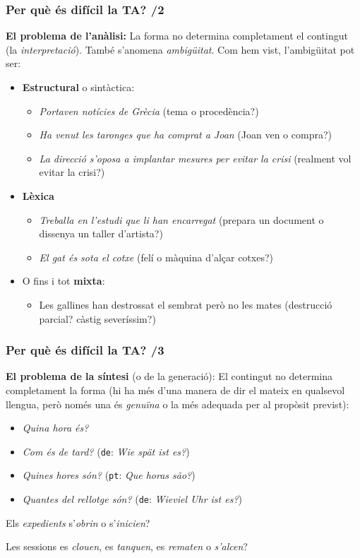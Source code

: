 \documentclass{beamer}
\newcommand{\empha}[1]{\emph{#1}\/}
\begin{document}
\begin{frame}
  \frametitle{ Per què és difícil la TA? /2} 
  
  \textbf{El problema de l'anàlisi:} La forma no determina completament el
  contingut (la \empha{interpretació}). També s'anomena \empha{ambigüitat}. 
  Com hem vist, l'ambigüitat pot ser:
  \begin{itemize}
  \item \textbf{Estructural} o sintàctica:
  \begin{itemize}
  \item \empha{Portaven notícies de Grècia} (tema o procedència?)
  \item \empha{Ha venut les taronges que ha
  comprat a Joan} (Joan ven o compra?)
  \item \empha{La direcció s'oposa a implantar mesures per evitar la crisi} (realment vol evitar la crisi?)
  \end{itemize}
  \item \textbf{Lèxica} 
    \begin{itemize}
  \item \empha{Treballa en l'estudi que li han encarregat} (prepara un document
  o dissenya un taller d'artista?)
  \item \empha{El gat és sota el cotxe} (felí o màquina d'alçar cotxes?)
    \end{itemize}
  \item O fins i tot \textbf{mixta}:
    \begin{itemize}
    \item Les gallines han destrossat el sembrat però no les mates (destrucció parcial? càstig severíssim?)
    \end{itemize}
  \end{itemize}
\end{frame}


\begin{frame}
  \frametitle{ Per què és difícil la TA? /3} 
  
  \textbf{El problema de la síntesi} (o de la generació): El contingut
  no determina completament la forma (hi ha més d'una manera de dir el
  mateix en qualsevol llengua, però només una és \empha{genuïna} o la
  més adequada per al propòsit previst):
  \begin{itemize}
  \item \empha{Quina hora és?}
  \item \empha{Com és de tard?} (\texttt{de}: \empha{Wie spät ist es?})
  \item \empha{Quines hores són?} (\texttt{pt}: \empha{Que horas s\~{a}o?})
  \item \empha{Quantes del rellotge són?} (\texttt{de}: \empha{Wieviel Uhr ist es?})
  \end{itemize}

  Els \empha{expedients} s'\empha{obrin} o s'\empha{inicien}?

  Les sessions es \empha{clouen}, es \empha{tanquen}, es \empha{rematen} o \empha{s'alcen}?

\end{frame}
\end{document}
